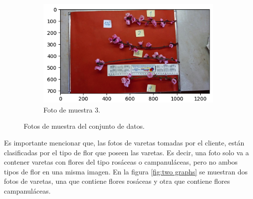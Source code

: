 \begin{figure}[ht]
\begin{subfigure}[b]{0.4\textwidth}
     \end{subfigure}
     \hfill
     \begin{subfigure}[b]{0.5\textwidth}
         \centering
         \includegraphics[scale=.45]{./Figures/flor_muestra6.png}
         \caption{Foto de muestra 3.}
         \label{fig:3de3}
     \end{subfigure}
        \caption{Fotos de muestra del conjunto de datos.}
        \label{fig:three graphs}
\end{figure}

Es importante mencionar que, las fotos de varetas tomadas por el cliente, están clasificadas por el tipo de flor que poseen las varetas. Es decir, una foto solo va a contener varetas con flores del tipo rosáceas o campanuláceas, pero no ambos tipos de flor en una misma imagen. En la figura \ref{fig:two graphs} se muestran dos fotos de varetas, una que contiene flores rosáceas y otra que contiene flores campanuláceas.

